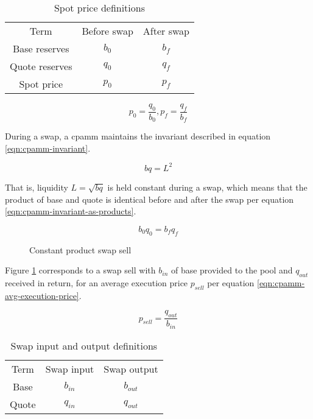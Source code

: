 \documentclass[table, twocolumn]{article}
\begin{document}
\begin{table}[ht]
  \centering
  \begin{tabular}{|c|c|c|}
    \hline
    \rowcolor{cyan}
    Term           & Before swap & After swap \\
    Base reserves  & $b_0$       & $b_f$      \\
    Quote reserves & $q_0$       & $q_f$      \\
    Spot price     & $p_0$       & $p_f$      \\
    \hline
  \end{tabular}
  \caption{Spot price definitions}
  \label{tab:spot-before-after-swap}
\end{table}

\begin{equation} \label{eqn:price-before-after}
  p_0 = \frac{q_0}{b_0},
  p_f = \frac{q_f}{b_f}
\end{equation}

During a swap, a \gls{cpamm} maintains the invariant described in equation
\ref{eqn:cpamm-invariant}.

\begin{equation} \label{eqn:cpamm-invariant}
  b q = L^2
\end{equation}

That is, liquidity $L = \sqrt{bq}$ is held constant during a swap, which means that the product of
base and quote is identical before and after the swap per equation
\ref{eqn:cpamm-invariant-as-products}.

\begin{equation} \label{eqn:cpamm-invariant-as-products}
  b_0 q_0 = b_f q_f
\end{equation}

\begin{figure}[ht]
  \centering
  
  \caption{Constant product swap sell}
  \label{fig:cpmm-swap-sell}
\end{figure}

Figure \ref{fig:cpmm-swap-sell} corresponds to a swap sell with $b_{in}$ of base provided to the
pool and $q_{out}$ received in return, for an average execution price $p_{sell}$ per equation
\ref{eqn:cpamm-avg-execution-price}.

\begin{equation} \label{eqn:cpamm-avg-execution-price}
  p_{sell} = \frac{q_{out}}{b_{in}}
\end{equation}

\begin{table}[ht]
  \centering
  \begin{tabular}{|c|c|c|}
    \hline
    \rowcolor{cyan}
    Term  & Swap input & Swap output \\
    Base  & $b_{in}$   & $b_{out}$   \\
    Quote & $q_{in}$   & $q_{out}$   \\
    \hline
  \end{tabular}
  \caption{Swap input and output definitions}
  \label{tab:swap-in-out}
\end{table}
\end{document}
